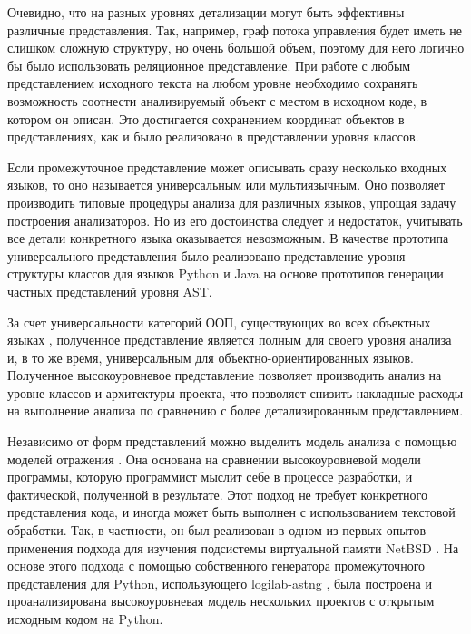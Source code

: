 \documentclass[10pt, a5paper]{article}
\begin{document}
Очевидно, что на разных уровнях детализации могут быть эффективны различные представления. Так, например, граф потока управления будет иметь не слишком сложную структуру, но очень большой объем, поэтому для него логично бы было использовать реляционное представление. При работе с любым представлением исходного текста на любом уровне необходимо сохранять возможность соотнести анализируемый объект с местом в исходном коде, в котором он описан. Это достигается сохранением координат объектов в представлениях, как и было реализовано в представлении уровня классов.

Если промежуточное представление может описывать сразу несколько входных языков, то оно называется универсальным или мультиязычным. Оно позволяет производить типовые процедуры анализа для различных языков, упрощая задачу построения анализаторов. Но из его достоинства следует и недостаток, учитывать все детали конкретного языка оказывается невозможным. В качестве прототипа универсального представления было реализовано представление уровня структуры классов для языков Python и Java на основе прототипов генерации частных представлений уровня AST.

За счет универсальности категорий ООП, существующих во всех объектных языках \cite{Zubov18}, полученное представление является полным для своего уровня анализа и, в то же время, универсальным для объектно-ориентированных языков. Полученное высокоуровневое представление позволяет производить анализ на уровне классов и архитектуры проекта, что позволяет снизить накладные расходы на выполнение анализа по сравнению с более детализированным представлением.

Независимо от форм представлений можно выделить модель анализа с помощью моделей отражения \cite{Zubov19}. Она основана на сравнении высокоуровневой модели программы, которую программист мыслит себе в процессе разработки, и фактической, полученной в результате. Этот подход не требует конкретного представления кода, и иногда может быть выполнен с использованием текстовой обработки. Так, в частности, он был реализован в одном из первых опытов применения подхода для изучения подсистемы виртуальной памяти NetBSD \cite{Zubov19}. На основе этого подхода с помощью собственного генератора промежуточного представления для Python, использующего logilab-astng \cite{Zubov7}, была построена и проанализирована высокоуровневая модель нескольких проектов с открытым исходным кодом на Python.
\end{document}
